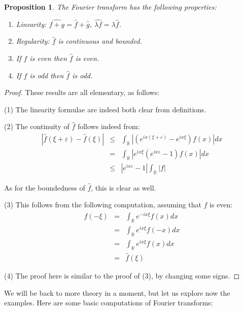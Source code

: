 \documentclass[12pt]{amsbook}
\newtheorem{proposition}[theorem]{Proposition}
\begin{document}
\begin{proposition}
The Fourier transform has the following properties:
\begin{enumerate}
\item Linearity: $\widehat{f+g}=\widehat{f}+\widehat{g}$, $\widehat{\lambda f}=\lambda\widehat{f}$.

\item Regularity: $\widehat{f}$ is continuous and bounded.

\item If $f$ is even then $\widehat{f}$ is even. 

\item If $f$ is odd then $\widehat{f}$ is odd. 
\end{enumerate}
\end{proposition}

\begin{proof}
These results are all elementary, as follows:

\medskip

(1) The linearity formulae are indeed both clear from definitions.

\medskip

(2) The continuity of $\widehat{f}$ follows indeed from:
\begin{eqnarray*}
|\widehat{f}(\xi+\varepsilon)-\widehat{f}(\xi)|
&\leq&\int_\mathbb R\left|(e^{ix(\xi+\varepsilon)}-e^{ix\xi})f(x)\right|dx\\
&=&\int_\mathbb R\left|e^{ix\xi}(e^{ix\varepsilon}-1)f(x)\right|dx\\
&\leq&|e^{ix\varepsilon}-1|\int_\mathbb R|f|
\end{eqnarray*}

As for the boundedness of $\widehat{f}$, this is clear as well.

\medskip

(3) This follows from the following computation, assuming that $f$ is even:
\begin{eqnarray*}
\widehat{f}(-\xi)
&=&\int_\mathbb R e^{-ix\xi}f(x)dx\\
&=&\int_\mathbb R e^{ix\xi}f(-x)dx\\
&=&\int_\mathbb R e^{ix\xi}f(x)dx\\
&=&\widehat{f}(\xi)
\end{eqnarray*}

(4) The proof here is similar to the proof of (3), by changing some signs.
\end{proof}

We will be back to more theory in a moment, but let us explore now the examples. Here are some basic computations of Fourier transforms:
\end{document}
